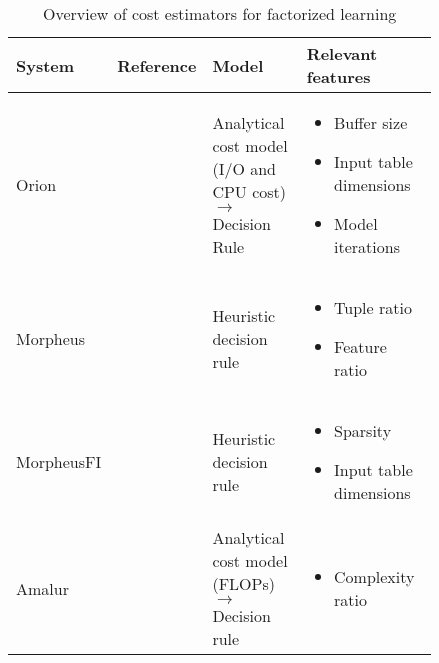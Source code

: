 \begin{table}[ht]
	\centering
	\begin{tabular}{p{0.15\linewidth}p{0.09\linewidth}p{0.25\linewidth}p{0.35\linewidth}}
		\toprule
		System     & Reference                                        & Model                                                                & Relevant features                                                                                                                           \\ \midrule \midrule
		Orion      & \cite{orion_learning_gen_lin_models}             & Analytical cost model (I/O and CPU cost) $\rightarrow$ Decision Rule & \begin{itemize}[noitemsep,topsep=0pt,leftmargin=0.3cm] \item Buffer size \item Input table dimensions \item Model iterations  \end{itemize} \\ \midrule
		Morpheus   & \cite{morpheus}                                  & Heuristic decision rule                                              & \begin{itemize}[noitemsep,topsep=0pt,leftmargin=0.3cm] \item Tuple ratio \item Feature ratio  \end{itemize}                                 \\\midrule
		MorpheusFI & \cite{MorpheusFIEnablingOptimizingNonlinear2019} & Heuristic decision rule                                              & \begin{itemize}[noitemsep,topsep=0pt,leftmargin=0.3cm] \item Sparsity \item Input table dimensions \end{itemize}                            \\\midrule
		Amalur     & \cite{schijndel_cost_estimation}                 & Analytical cost model (FLOPs) $\rightarrow$ Decision rule            & \begin{itemize}[noitemsep,topsep=0pt,leftmargin=00.3cm] \item Complexity ratio \end{itemize}                                                \\
		\bottomrule
	\end{tabular}
	\caption{Overview of cost estimators for factorized learning}
	\label{tab:cost_model_overview}
\end{table}

